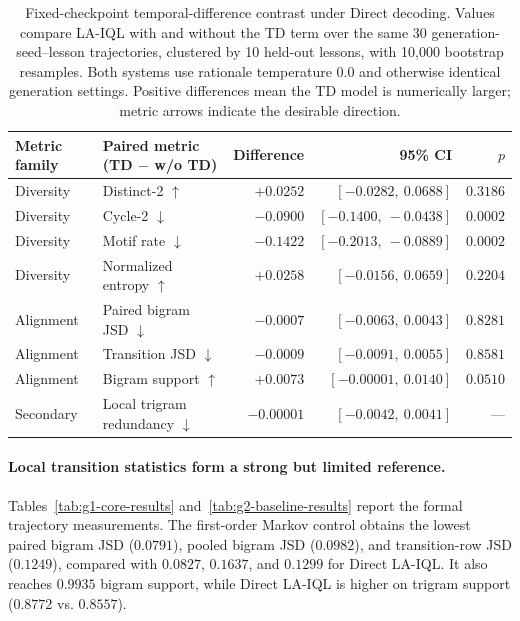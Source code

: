\documentclass[manuscript,review,anonymous]{acmart}
\begin{document}
\begin{table}[t]
\centering
\small
\setlength{\tabcolsep}{4pt}
\begin{tabular}{llrrr}
\toprule
Metric family & Paired metric (TD $-$ w/o TD) & Difference & 95\% CI & $p$ \\
\midrule
Diversity & Distinct-2 $\uparrow$ & $+0.0252$ & $[-0.0282,\ 0.0688]$ & $0.3186$ \\
Diversity & Cycle-2 $\downarrow$ & $-0.0900$ & $[-0.1400,\ -0.0438]$ & $0.0002$ \\
Diversity & Motif rate $\downarrow$ & $-0.1422$ & $[-0.2013,\ -0.0889]$ & $0.0002$ \\
Diversity & Normalized entropy $\uparrow$ & $+0.0258$ & $[-0.0156,\ 0.0659]$ & $0.2204$ \\
Alignment & Paired bigram JSD $\downarrow$ & $-0.0007$ & $[-0.0063,\ 0.0043]$ & $0.8281$ \\
Alignment & Transition JSD $\downarrow$ & $-0.0009$ & $[-0.0091,\ 0.0055]$ & $0.8581$ \\
Alignment & Bigram support $\uparrow$ & $+0.0073$ & $[-0.00001,\ 0.0140]$ & $0.0510$ \\
Secondary & Local trigram redundancy $\downarrow$ & $-0.00001$ & $[-0.0042,\ 0.0041]$ & --- \\
\bottomrule
\end{tabular}
\caption{Fixed-checkpoint temporal-difference contrast under Direct decoding. Values
compare LA-IQL with and without the TD term over the same 30 generation-seed--lesson
trajectories, clustered by 10 held-out lessons, with 10,000 bootstrap
resamples. Both systems use rationale temperature 0.0 and otherwise identical
generation settings. Positive differences mean the TD model is numerically
larger; metric arrows indicate the desirable direction.}
\label{tab:td-ablation-paired}
\end{table}
 
\paragraph{Local transition statistics form a strong but limited reference.}
Tables~\ref{tab:g1-core-results} and~\ref{tab:g2-baseline-results} report the
formal trajectory measurements. The first-order Markov control obtains the
lowest paired bigram JSD ($0.0791$), pooled bigram JSD ($0.0982$), and
transition-row JSD ($0.1249$), compared with $0.0827$, $0.1637$, and $0.1299$
for Direct LA-IQL. It also reaches $0.9935$ bigram support, while Direct
LA-IQL is higher on trigram support ($0.8772$ vs. $0.8557$).
\end{document}
